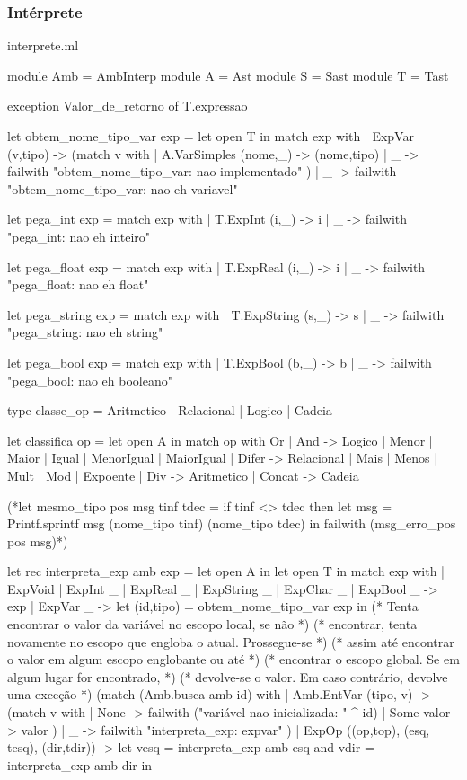 \documentclass[12pt,a4paper,twoside]{article}
\begin{document}
\subsubsection{Intérprete}
interprete.ml
\begin{terminal}
module Amb = AmbInterp
module A = Ast
module S = Sast
module T = Tast

exception Valor_de_retorno of T.expressao

let obtem_nome_tipo_var exp = let open T in
  match exp with
  | ExpVar (v,tipo) ->
    (match v with
      | A.VarSimples (nome,_) -> (nome,tipo)
      | _ -> failwith "obtem_nome_tipo_var: nao implementado"
    )
  | _ -> failwith "obtem_nome_tipo_var: nao eh variavel"

let pega_int exp =
  match exp with
  |  T.ExpInt (i,_) -> i
  | _ -> failwith "pega_int: nao eh inteiro"

let pega_float exp =
  match exp with
  |  T.ExpReal (i,_) -> i
  | _ -> failwith "pega_float: nao eh float"  

let pega_string exp =
  match exp with
  |  T.ExpString (s,_) -> s
  | _ -> failwith "pega_string: nao eh string"

let pega_bool exp =
  match exp with
  |  T.ExpBool (b,_) -> b
  | _ -> failwith "pega_bool: nao eh booleano"  

type classe_op = Aritmetico | Relacional | Logico | Cadeia

let classifica op =
  let open A in
  match op with
    Or
  | And  -> Logico
  | Menor
  | Maior
  | Igual
  | MenorIgual
  | MaiorIgual
  | Difer -> Relacional
  | Mais
  | Menos
  | Mult
  | Mod
  | Expoente
  | Div -> Aritmetico
  | Concat -> Cadeia


(*let mesmo_tipo pos msg tinf tdec =
  if tinf <> tdec
  then
    let msg = Printf.sprintf msg (nome_tipo tinf) (nome_tipo tdec) in
    failwith (msg_erro_pos pos msg)*)

let rec interpreta_exp amb exp =
  let open A in
  let open T in
  match exp with
  | ExpVoid
  | ExpInt _
  | ExpReal _
  | ExpString _
  | ExpChar _
  | ExpBool _   -> exp
  | ExpVar _ ->
    let (id,tipo) = obtem_nome_tipo_var exp in
    (* Tenta encontrar o valor da variável no escopo local, se não      *)
    (* encontrar, tenta novamente no escopo que engloba o atual. Prossegue-se *)
    (* assim até encontrar o valor em algum escopo englobante ou até    *)
    (* encontrar o escopo global. Se em algum lugar for encontrado,         *)
    (* devolve-se o valor. Em caso contrário, devolve uma exceção       *)
    (match (Amb.busca amb id) with
     | Amb.EntVar (tipo, v) ->
       (match v with
        | None -> failwith ("variável nao inicializada: " ^ id)
        | Some valor -> valor
       )
     |  _ -> failwith "interpreta_exp: expvar"
    )
  | ExpOp ((op,top), (esq, tesq), (dir,tdir)) ->
    let  vesq = interpreta_exp amb esq
    and vdir = interpreta_exp amb dir in


\end{terminal}
\end{document}
